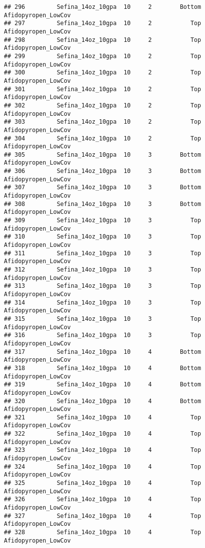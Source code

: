 \documentclass[
]{article}
\begin{document}
\begin{verbatim}
## 296         Sefina_14oz_10gpa  10     2        Bottom    Afidopyropen_LowCov
## 297         Sefina_14oz_10gpa  10     2           Top    Afidopyropen_LowCov
## 298         Sefina_14oz_10gpa  10     2           Top    Afidopyropen_LowCov
## 299         Sefina_14oz_10gpa  10     2           Top    Afidopyropen_LowCov
## 300         Sefina_14oz_10gpa  10     2           Top    Afidopyropen_LowCov
## 301         Sefina_14oz_10gpa  10     2           Top    Afidopyropen_LowCov
## 302         Sefina_14oz_10gpa  10     2           Top    Afidopyropen_LowCov
## 303         Sefina_14oz_10gpa  10     2           Top    Afidopyropen_LowCov
## 304         Sefina_14oz_10gpa  10     2           Top    Afidopyropen_LowCov
## 305         Sefina_14oz_10gpa  10     3        Bottom    Afidopyropen_LowCov
## 306         Sefina_14oz_10gpa  10     3        Bottom    Afidopyropen_LowCov
## 307         Sefina_14oz_10gpa  10     3        Bottom    Afidopyropen_LowCov
## 308         Sefina_14oz_10gpa  10     3        Bottom    Afidopyropen_LowCov
## 309         Sefina_14oz_10gpa  10     3           Top    Afidopyropen_LowCov
## 310         Sefina_14oz_10gpa  10     3           Top    Afidopyropen_LowCov
## 311         Sefina_14oz_10gpa  10     3           Top    Afidopyropen_LowCov
## 312         Sefina_14oz_10gpa  10     3           Top    Afidopyropen_LowCov
## 313         Sefina_14oz_10gpa  10     3           Top    Afidopyropen_LowCov
## 314         Sefina_14oz_10gpa  10     3           Top    Afidopyropen_LowCov
## 315         Sefina_14oz_10gpa  10     3           Top    Afidopyropen_LowCov
## 316         Sefina_14oz_10gpa  10     3           Top    Afidopyropen_LowCov
## 317         Sefina_14oz_10gpa  10     4        Bottom    Afidopyropen_LowCov
## 318         Sefina_14oz_10gpa  10     4        Bottom    Afidopyropen_LowCov
## 319         Sefina_14oz_10gpa  10     4        Bottom    Afidopyropen_LowCov
## 320         Sefina_14oz_10gpa  10     4        Bottom    Afidopyropen_LowCov
## 321         Sefina_14oz_10gpa  10     4           Top    Afidopyropen_LowCov
## 322         Sefina_14oz_10gpa  10     4           Top    Afidopyropen_LowCov
## 323         Sefina_14oz_10gpa  10     4           Top    Afidopyropen_LowCov
## 324         Sefina_14oz_10gpa  10     4           Top    Afidopyropen_LowCov
## 325         Sefina_14oz_10gpa  10     4           Top    Afidopyropen_LowCov
## 326         Sefina_14oz_10gpa  10     4           Top    Afidopyropen_LowCov
## 327         Sefina_14oz_10gpa  10     4           Top    Afidopyropen_LowCov
## 328         Sefina_14oz_10gpa  10     4           Top    Afidopyropen_LowCov

\end{verbatim}
\end{document}
